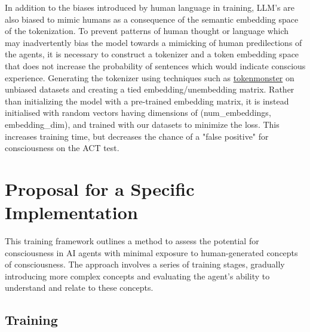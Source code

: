 \documentclass{article}
\begin{document}
In addition to the biases introduced by human language in training, LLM's are also biased to mimic humans as a consequence of the semantic embedding space of the tokenization. To prevent patterns of human thought or language which may inadvertently bias the model towards a mimicking of human predilections of the  agents, it is necessary to construct a tokenizer and a token embedding space that does not increase the probability of sentences which would indicate conscious experience. Generating the tokenizer using techniques such as \href{https://github.com/alasdairforsythe/tokenmonster}{tokenmonster} on unbiased datasets and creating a tied embedding/unembedding matrix. Rather than initializing the model with a pre-trained embedding matrix, it is instead initialised with random vectors having dimensions of (num\_embeddings, embedding\_dim), and trained with our datasets to minimize the loss. This increases training time, but decreases the chance of a "false positive" for consciousness on the ACT test. 


\section{Proposal for a Specific Implementation}

This training framework outlines a method to assess the potential for consciousness in AI agents with minimal exposure to human-generated concepts of consciousness. The approach involves a series of training stages, gradually introducing more complex concepts and evaluating the agent's ability to understand and relate to these concepts. 

\subsection{Training}
\end{document}
